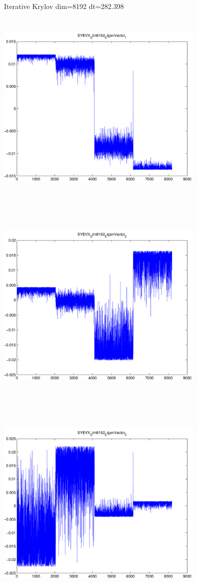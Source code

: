 \documentclass[9pt]{article}
\theoremstyle{plain}
\theoremstyle{definition}
\theoremstyle{remark}
\numberwithin{equation}{section}
\begin{document}
Iterative Krylov dim=8192 dt=282.398
\includegraphics[width=10.0cm,height=10.0cm]{SYEVX_Dim8192_EigenVector_1.pdf}

\includegraphics[width=10.0cm,height=10.0cm]{SYEVX_Dim8192_EigenVector_2.pdf}

\includegraphics[width=10.0cm,height=10.0cm]{SYEVX_Dim8192_EigenVector_3.pdf}
\end{document}
